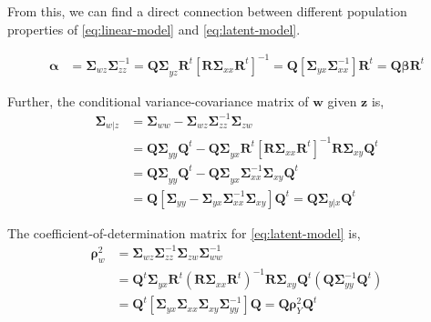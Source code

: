 \documentclass[review]{elsarticle}
\providecommand{\tightlist}{%
  \setlength{\itemsep}{0pt}\setlength{\parskip}{0pt}}
\theoremstyle{definition}
\theoremstyle{definition}
\theoremstyle{remark}
\begin{document}
From this, we can find a direct connection between different population
properties of \eqref{eq:linear-model} and \eqref{eq:latent-model}.

\begin{description}
\tightlist
\item[Regression Coefficients]
\[
  \begin{aligned}
  \boldsymbol{\alpha} &= \boldsymbol{\Sigma}_{wz} \boldsymbol{\Sigma}_{zz}^{-1}
  = \boldsymbol{Q\Sigma}_{yz}\mathbf{R}^t\left[\boldsymbol{R\Sigma}_{xx}\mathbf{R}^t\right]^{-1}
  = \mathbf{Q}\left[\boldsymbol{\Sigma}_{yx}\boldsymbol{\Sigma}_{xx}^{-1}\right]\mathbf{R}^t
  = \mathbf{Q}\boldsymbol{\beta}\mathbf{R}^t
  \end{aligned}
  \]
\item[Conditional Variance]
Further, the conditional variance-covariance matrix of \(\mathbf{w}\)
given \(\mathbf{z}\) is, \[
  \begin{aligned}
\boldsymbol{\Sigma}_{w|z}
&= \boldsymbol{\Sigma}_{ww} - \boldsymbol{\Sigma}_{wz}\boldsymbol{\Sigma}_{zz}^{-1}\boldsymbol{\Sigma}_{zw} \\
&= \boldsymbol{Q\Sigma}_{yy}\mathbf{Q}^t -
  \boldsymbol{Q \Sigma}_{yx}\mathbf{R}^t \left[\boldsymbol{R\Sigma}_{xx}\boldsymbol{R}^t\right]^{-1}
  \boldsymbol{R\Sigma}_{xy}\mathbf{Q}^t \nonumber \\
&= \boldsymbol{Q\Sigma}_{yy}\mathbf{Q}^t - 
  \boldsymbol{Q \Sigma}_{yx}\boldsymbol{\Sigma}_{xx}^{-1}\boldsymbol{\Sigma}_{xy}\mathbf{Q}^t \\
&= \mathbf{Q}\left[\boldsymbol{\Sigma}_{yy} -
  \boldsymbol{\Sigma}_{yx}\boldsymbol{\Sigma}_{xx}^{-1}\boldsymbol{\Sigma}_{xy}\right]\mathbf{Q}^{t}
= \mathbf{Q} \boldsymbol{\Sigma}_{y|x}\mathbf{Q}^t
  \end{aligned}
  \]
\item[Coefficient of Determination]
The coefficient-of-determination matrix for \eqref{eq:latent-model} is, \[
  \begin{aligned}
\boldsymbol{\rho}^2_w &= \boldsymbol{\Sigma}_{wz} 
\boldsymbol{\Sigma}_{zz}^{-1} \boldsymbol{\Sigma}_{zw} 
\boldsymbol{\Sigma}_{ww}^{-1} \\
  &=\mathbf{Q}^t
  \boldsymbol{\Sigma}_{yx}\mathbf{R}^t \left(\mathbf{R}\boldsymbol{\Sigma}_{xx}\mathbf{R}^t\right)^{-1}
  \mathbf{R}\boldsymbol{\Sigma}_{xy}\mathbf{Q}^t \left(\mathbf{Q} \boldsymbol{\Sigma}_{yy}^{-1} \mathbf{Q}^t\right) \nonumber \\
  &=\mathbf{Q}^t\left[\boldsymbol{\Sigma}_{yx}\boldsymbol{\Sigma}_{xx}\boldsymbol{\Sigma}_{xy}\boldsymbol{\Sigma}_{yy}^{-1}\right]\mathbf{Q}
  = \mathbf{Q}\boldsymbol{\rho}_{Y}^2 \mathbf{Q}^t
  \end{aligned}
  \]
\end{description}
\end{document}
